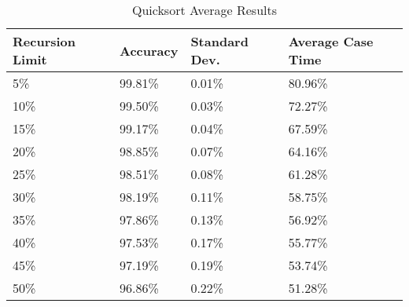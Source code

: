 \begin{table}[]
  \centering
  \caption{Quicksort Average Results}
  \label{quicksortT2}
  \begin{tabular}{|l|l|l|l|}
    \hline
    \textbf{Recursion Limit} & \textbf{Accuracy}  & \textbf{Standard Dev.}  & \textbf{Average Case Time}           \\ \hline
5\% &  99.81\% &0.01\% &80.96\%   \\ \hline
10\% &  99.50\% &0.03\% &72.27\%   \\ \hline
15\% &  99.17\% &0.04\% &67.59\%   \\ \hline
20\% &  98.85\% &0.07\% &64.16\%   \\ \hline
25\% &  98.51\% &0.08\% &61.28\%   \\ \hline
30\% &  98.19\% &0.11\% &58.75\%   \\ \hline
35\% &  97.86\% &0.13\% &56.92\%   \\ \hline
40\% &  97.53\% &0.17\% &55.77\%   \\ \hline
45\% &  97.19\% &0.19\% &53.74\%   \\ \hline
50\% &  96.86\% &0.22\% &51.28\%   \\ \hline
  \end{tabular}
\end{table}
